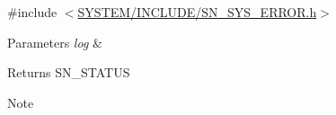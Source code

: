 {\ttfamily \#include $<$\hyperlink{SN__SYS__ERROR_8h}{S\+Y\+S\+T\+E\+M/\+I\+N\+C\+L\+U\+D\+E/\+S\+N\+\_\+\+S\+Y\+S\+\_\+\+E\+R\+R\+O\+R.\+h}$>$}


\begin{DoxyParams}{Parameters}
{\em log} & \\
\hline
\end{DoxyParams}
\begin{DoxyReturn}{Returns}
S\+N\+\_\+\+S\+T\+A\+T\+US 
\end{DoxyReturn}
\begin{DoxyNote}{Note}

\end{DoxyNote}
